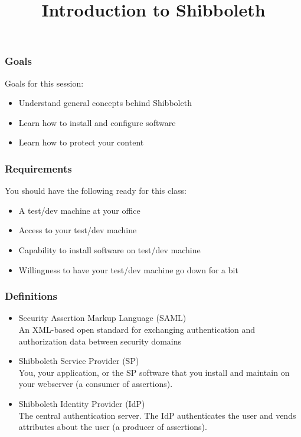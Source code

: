 


\title[Shibboleth Bootcamp]{Introduction to Shibboleth}



\begin{frame}
\frametitle{Goals}

Goals for this session:
\begin{itemize}
\item Understand general concepts behind Shibboleth
\item Learn how to install and configure software
\item Learn how to protect your content
\end{itemize}

\end{frame}

\begin{frame}
\frametitle{Requirements}

You should have the following ready for this class:
\begin{itemize}
\item A test/dev machine at your office
\item Access to your test/dev machine
\item Capability to install software on test/dev machine
\item Willingness to have your test/dev machine go down for a bit
\end{itemize}

\end{frame}

\begin{frame}
\frametitle{Definitions}
\begin{itemize} %
\item Security Assertion Markup Language (SAML) \\ An XML-based open standard for exchanging authentication and authorization data between security domains
\item Shibboleth Service Provider (SP) \\ You, your application, or the SP software that you install and maintain on your webserver (a consumer of assertions).
\item Shibboleth Identity Provider (IdP) \\ The central authentication server. The IdP authenticates the user and vends attributes about the user (a producer of assertions).
\end{itemize}
\end{frame}

